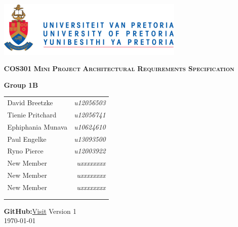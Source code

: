 \begin{titlepage}
\begin{center}
\includegraphics[width=350px]{University_of_Pretoria_Logo.png}
\newline
\newline


\begin{flushright} \large
\textbf {\textsc{\LARGE COS301}}\newline
\textbf {\textsc{\LARGE Mini Project}}\newline
\textbf {\textsc{\LARGE Architectural Requirements Specification}}\newline
\end{flushright}



\textbf{Group 1B} \\

\vspace{0.5 cm}
\begin{tabular}{lr}
David Breetzke&\emph{u12056503} \\
Tienie Pritchard&\emph{u12056741} \\
Ephiphania Munava&\emph{u10624610} \\
Paul Engelke&\emph{u13093500} \\
Ryno Pierce&\emph{u12003922} \\
New Member&\emph{uxxxxxxxx} \\
New Member&\emph{uxxxxxxxx} \\
New Member&\emph{uxxxxxxxx} \\ 
\\
\\

\end{tabular}

\vspace{1cm}
\textbf{GitHub:}\href{https://github.com/davidbreetzke/COS_301_Phase2_1B}{Visit}
\vfill
{\large Version 1}
\\
{\large \today}

\end{center}
\end{titlepage}
